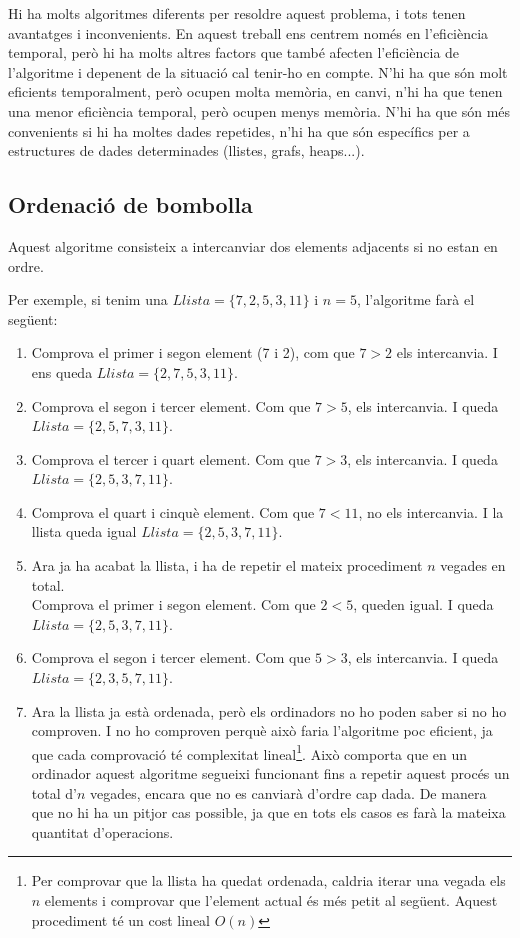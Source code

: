 Hi ha molts algoritmes diferents per resoldre aquest problema, i tots tenen avantatges i inconvenients. En aquest treball ens centrem només en l'eficiència temporal, però hi ha molts altres factors que també afecten l'eficiència de l'algoritme i depenent de la situació cal tenir-ho en compte. N'hi ha que són molt eficients temporalment, però ocupen molta memòria, en canvi, n'hi ha que tenen una menor eficiència temporal, però ocupen menys memòria. N'hi ha que són més convenients si hi ha moltes dades repetides, n'hi ha que són específics per a estructures de dades determinades (llistes, grafs, heaps...).

\subsection{Ordenació de bombolla}
Aquest algoritme consisteix a intercanviar dos elements adjacents si no estan en ordre.

Per exemple, si tenim una $Llista = \lbrace7, 2, 5, 3, 11\rbrace$ i $n = 5$, l'algoritme farà el següent:

\begin{enumerate}
    \item Comprova el primer i segon element (7 i 2), com que $7 > 2$ els intercanvia. I ens queda $Llista = \lbrace2, 7, 5, 3, 11\rbrace$.
    \item Comprova el segon i tercer element. Com que $7 > 5$, els intercanvia. I queda $Llista = \lbrace2, 5, 7, 3, 11\rbrace$.
    \item Comprova el tercer i quart element. Com que $7 > 3$, els intercanvia. I queda $Llista = \lbrace2, 5, 3, 7, 11\rbrace$.
    \item Comprova el quart i cinquè element. Com que $7 < 11$, no els intercanvia. I la llista queda igual $Llista = \lbrace2, 5, 3, 7, 11\rbrace$.
    \item Ara ja ha acabat la llista, i ha de repetir el mateix procediment $n$ vegades en total. \\ Comprova el primer i segon element. Com que $2 < 5$, queden igual. I queda $Llista = \lbrace2, 5, 3, 7, 11\rbrace$.
    \item Comprova el segon i tercer element. Com que $5 > 3$, els intercanvia. I queda $Llista = \lbrace2, 3, 5, 7, 11\rbrace$.
    \item Ara la llista ja està ordenada, però els ordinadors no ho poden saber si no ho comproven. I no ho comproven perquè això faria l'algoritme poc eficient, ja que cada comprovació té complexitat lineal\footnote{Per comprovar que la llista ha quedat ordenada, caldria iterar una vegada els $n$ elements i comprovar que l'element actual és més petit al següent. Aquest procediment té un cost lineal $O(n)$}. Això comporta que en un ordinador aquest algoritme segueixi funcionant fins a repetir aquest procés un total d'$n$ vegades, encara que no es canviarà d'ordre cap dada. De manera que no hi ha un pitjor cas possible, ja que en tots els casos es farà la mateixa quantitat d'operacions.
\end{enumerate}

